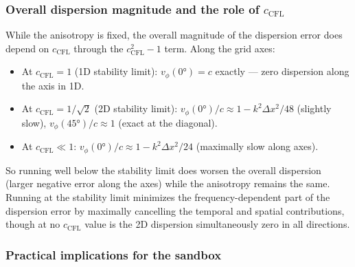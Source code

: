 \documentclass[11pt,a4paper]{article}
\begin{document}
\subsubsection*{Overall dispersion magnitude and the role of $c_{\mathrm{CFL}}$}

While the anisotropy is fixed, the overall magnitude of the dispersion error does depend on $c_{\mathrm{CFL}}$ through the $c_{\mathrm{CFL}}^2 - 1$ term.  Along the grid axes:
\begin{itemize}
  \item At $c_{\mathrm{CFL}} = 1$ (1D stability limit): $v_\phi(0°) = c$ exactly --- zero dispersion along the axis in 1D.
  \item At $c_{\mathrm{CFL}} = 1/\sqrt{2}$ (2D stability limit): $v_\phi(0°)/c \approx 1 - k^2\Delta x^2/48$ (slightly slow), $v_\phi(45°)/c \approx 1$ (exact at the diagonal).
  \item At $c_{\mathrm{CFL}} \ll 1$: $v_\phi(0°)/c \approx 1 - k^2\Delta x^2/24$ (maximally slow along axes).
\end{itemize}
So running well below the stability limit does worsen the overall dispersion (larger negative error along the axes) while the anisotropy remains the same.  Running at the stability limit minimizes the frequency-dependent part of the dispersion error by maximally cancelling the temporal and spatial contributions, though at no $c_{\mathrm{CFL}}$ value is the 2D dispersion simultaneously zero in all directions.

\subsubsection*{Practical implications for the sandbox}
\end{document}
